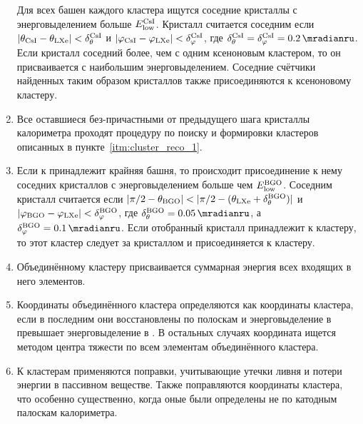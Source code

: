 \begin{enumerate}
    Для всех башен каждого  кластера ищутся соседние  кристаллы
    с энерговыделением больше $E_{\text{low}}^{\ce{CsI}}$.
    Кристалл считается соседним если
    $ | \theta_{\ce{CsI}} - \theta_{\ce{LXe}} | < \delta_\theta^{\ce{CsI}} $
    и
    $ | \varphi_{\ce{CsI}} - \varphi_{\ce{LXe}} | < \delta_\varphi^{\ce{CsI}} $,
    где $\delta_\theta^{\ce{CsI}} = \delta_\varphi^{\ce{CsI}} = \SI{0.2}{\mradianru}$.
    Если кристалл соседний более,
    чем с одним ксеноновым кластером,
    то он присваивается  с наибольшим энерговыделением.
    Соседние счётчики найденных таким образом кристаллов также присоединяются к ксеноновому кластеру.
    \item Все оставшиеся без-причастными от предыдущего шага кристаллы  калориметра проходят процедуру по поиску и формировки кластеров описанных в пункте~\ref{itm:cluster_reco_1}.
    \item Если к  принадлежит крайняя башня,
    то происходит присоединение к нему соседних кристаллов  
    с энерговыделением больше чем $E_{\text{low}}^{\ce{BGO}}$.
    Соседним кристалл считается если
    $ | \pi/2 - \theta_{\ce{BGO}} | < | \pi/2 - (\theta_{\ce{LXe}} + \delta_{\theta}^{\ce{BGO}}) | $
    и
    $ | \varphi_{\ce{BGO}} - \varphi_{\ce{LXe}} | < \delta_\varphi^{\ce{BGO}} $,
    где $\delta_\theta^{\ce{BGO}} = \SI{0.05}{\mradianru}$,
    а $\delta_\varphi^{\ce{BGO}} = \SI{0.1}{\mradianru}$.
    Если отобранный  кристалл принадлежит к  кластеру,
    то этот кластер следует за кристаллом и присоединяется к  кластеру.
    \item Объединённому кластеру присваивается суммарная энергия всех входящих в него элементов.
    \item Координаты объединённого кластера определяются как координаты  кластера,
    если в последним они восстановлены по полоскам и энерговыделение в  превышает
    энерговыделение в .
    В остальных случаях координата ищется методом центра тяжести по всем элементам объединённого кластера.
    \item К кластерам применяются поправки,
    учитывающие утечки ливня и потери энергии в пассивном веществе.
    Также поправляются координаты кластера,
    что особенно существенно,
    когда оные были определены не по катодным палоскам  калориметра.
\end{enumerate}





